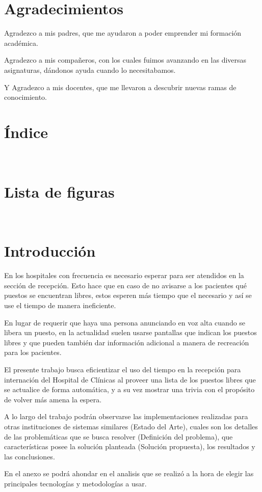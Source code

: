 \documentclass{article}
\begin{document}
\section*{Agradecimientos}

Agradezco a mis padres, que me ayudaron a poder emprender mi formación académica.

Agradezco a mis compañeros, con los cuales fuimos avanzando en las diversas asignaturas, dándonos ayuda cuando lo necesitabamos.

Y Agradezco a mis docentes, que me llevaron a descubrir nuevas ramas de conocimiento.
\newpage
\
\newpage
\section*{Índice}
\newpage
\
\newpage
\section*{Lista de figuras}
\newpage
\
\newpage
\section{Introducción}
En los hospitales con frecuencia es necesario esperar para ser atendidos en la sección de recepción. Esto hace que en caso de no avisarse a los pacientes qué puestos se encuentran libres, estos esperen más tiempo que el necesario y así se use el tiempo de manera ineficiente.

En lugar de requerir que haya una persona anunciando en voz alta cuando se libera un puesto, en la actualidad suelen usarse pantallas que indican los puestos libres y que pueden también dar información adicional a manera de recreación para los pacientes.

El presente trabajo busca eficientizar el uso del tiempo en la recepción para internación del Hospital de Clínicas al proveer una lista de los puestos libres que se actualice de forma automática, y a su vez mostrar una trivia con el propósito de volver más amena la espera.

A lo largo del trabajo podrán observarse las implementaciones realizadas para otras instituciones de sistemas similares (Estado del Arte), cuales son los detalles de las problemáticas que se busca resolver (Definición del problema), que características posee la solución planteada (Solución propuesta), los resultados y las conclusiones.

En el anexo se podrá ahondar en el analisis que se realizó a la hora de elegir las principales tecnologías y metodologías a usar.
\newpage
\end{document}

